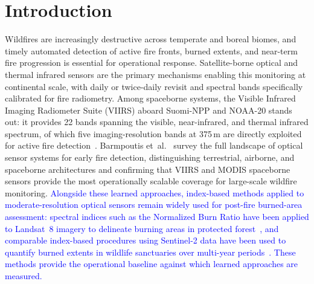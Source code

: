 \documentclass[sensors,article,submit,moreauthors,pdftex]{Definitions/mdpi}
\newcommand{\rev}[1]{\textcolor{blue}{#1}}
\begin{document}
\label{LastPage}

\maketitle


\section{Introduction}

Wildfires are increasingly destructive across temperate and boreal
biomes, and timely automated detection of active fire fronts, burned
extents, and near-term fire progression is essential for operational
response. Satellite-borne optical and thermal infrared sensors are
the primary mechanisms enabling this monitoring at continental
scale, with daily or twice-daily revisit and spectral bands
specifically calibrated for fire radiometry. Among spaceborne 
systems, the Visible Infrared Imaging Radiometer Suite (VIIRS)
aboard Suomi-NPP and NOAA-20 stands out: it provides 22 
bands spanning the visible, near-infrared, and thermal infrared
spectrum, of which five imaging-resolution bands at 375\,m are
directly exploited for active fire detection~\cite{schroeder2014new}.
Barmpoutis et~al.~\cite{barmpoutis2020review} survey the full
landscape of optical sensor systems for early fire detection,
distinguishing terrestrial, airborne, and spaceborne 
architectures and confirming that VIIRS and MODIS spaceborne
sensors provide the most operationally scalable coverage for
large-scale wildfire monitoring. \rev{Alongside these learned approaches,
index-based methods applied to moderate-resolution optical sensors remain
widely used for post-fire burned-area assessment: spectral indices such as the
Normalized Burn Ratio have been applied to Landsat~8 imagery to delineate
burning areas in protected forest~\cite{laosuwan2023inspection}, and
comparable index-based procedures using Sentinel-2 data have been used to
quantify burned extents in wildlife sanctuaries over multi-year
periods~\cite{uttaruk2022burned}. These methods provide the operational
baseline against which learned approaches are measured.}
\end{document}
